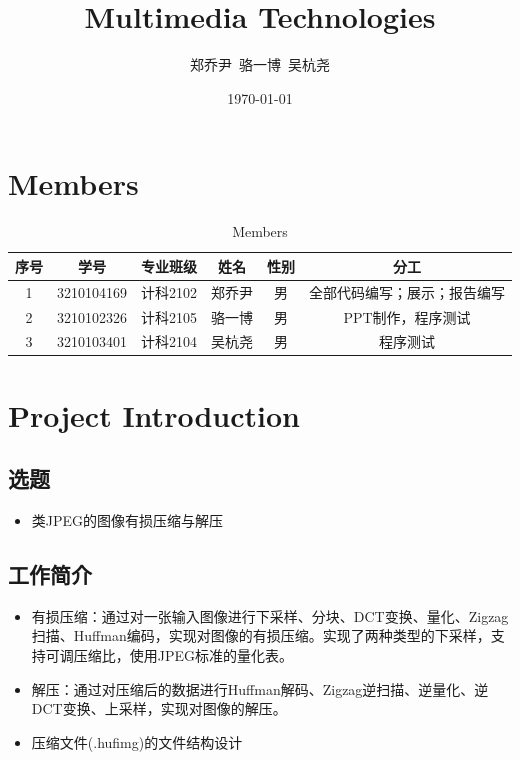 \documentclass{article}
\title{Multimedia Technologies}
\author{郑乔尹\ 骆一博\ 吴杭尧}
\date{\today}
\begin{document}
\doublespacing %
\maketitle

\section{Members}

\begin{table}[htbp]
    \centering
    \begin{tabular}{|c|c|c|c|c|c|}
        \hline
        序号 & 学号 & 专业班级 & 姓名 & 性别 & 分工 \\
        \hline
        1 & 3210104169 & 计科2102 & 郑乔尹 & 男 & 全部代码编写；展示；报告编写 \\
        \hline
        2 & 3210102326 & 计科2105 & 骆一博 & 男 & PPT制作，程序测试 \\
        \hline
        3 & 3210103401 & 计科2104 & 吴杭尧 & 男 & 程序测试 \\
        \hline
    \end{tabular}
    \caption{Members}
\end{table}


\section{Project Introduction}

\subsection{选题}

\begin{itemize}
    \item 类JPEG的图像有损压缩与解压
\end{itemize}

\subsection{工作简介}

\begin{itemize}
    \item 有损压缩：通过对一张输入图像进行下采样、分块、DCT变换、量化、Zigzag扫描、Huffman编码，实现对图像的有损压缩。实现了两种类型的下采样，支持可调压缩比，使用JPEG标准的量化表。
    \item 解压：通过对压缩后的数据进行Huffman解码、Zigzag逆扫描、逆量化、逆DCT变换、上采样，实现对图像的解压。
    \item 压缩文件(.hufimg)的文件结构设计
\end{itemize}
\end{document}
